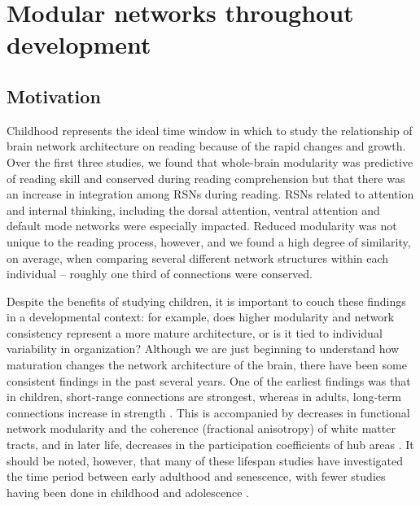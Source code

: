 \chapter{Modular networks throughout development}

\section{Motivation}

Childhood represents the ideal time window in which to study the relationship of brain network architecture on reading because of the rapid changes and growth. Over the first three studies, we found that whole-brain modularity was predictive of reading skill and conserved during reading comprehension but that there was an increase in integration among RSNs during reading. RSNs related to attention and internal thinking, including the dorsal attention, ventral attention and default mode networks were especially impacted. Reduced modularity was not unique to the reading process, however, and we found a high degree of similarity, on average, when comparing several different network structures within each individual -- roughly one third of connections were conserved. 

Despite the benefits of studying children, it is important to couch these findings in a developmental context: for example, does higher modularity and network consistency represent a more mature architecture, or is it tied to individual variability in organization? Although we are just beginning to understand how maturation changes the network architecture of the brain, there have been some consistent findings in the past several years. One of the earliest findings was that in children, short-range connections are strongest, whereas in adults, long-term connections increase in strength \citep{Power2010, Chan2014}. This is accompanied by decreases in functional network modularity and the coherence (fractional anisotropy) of white matter tracts, and in later life, decreases in the participation coefficients of hub areas \citep{Betzel2014}. It should be noted, however, that many of these lifespan studies have investigated the time period between early adulthood and senescence, with fewer studies having been done in childhood and adolescence \citep{Cao2016}.

